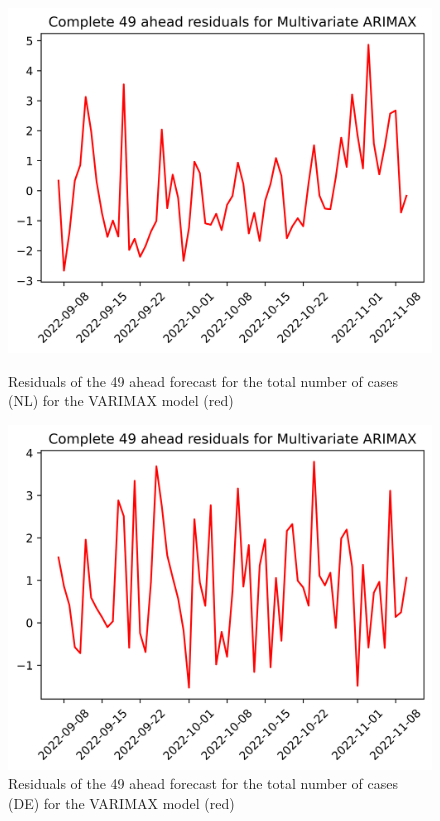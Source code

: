 \begin{figure}

\begin{minipage}{.45\textwidth}
  \centering
  \includegraphics[width=\linewidth]{pics/49_ah/49_ahead_errors_Multivariate ARIMAX.png}
  \caption{Residuals of the 49 ahead forecast for the total number of cases (NL) for the VARIMAX model (red)}
  \label{fig:tot_cases_error_49_VARIMAX}
\end{minipage}
\begin{minipage}{.45\textwidth}
  \centering
  \includegraphics[width=\linewidth]{pics/49_ah/DE_49_ahead_errors_Multivariate ARIMAX.png}
  \caption{Residuals of the 49 ahead forecast for the total number of cases (DE) for the VARIMAX model (red)}
  \label{fig:tot_cases_error_49_VARIMAX_DE}
\end{minipage}

\end{figure}
